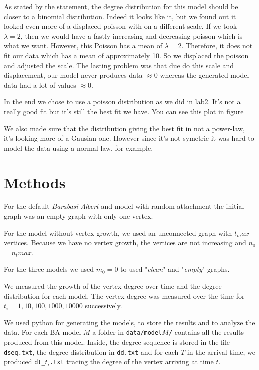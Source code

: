 \documentclass{article}
\begin{document}
As stated by the statement, the degree distribution for this model should be
closer to a binomial distribution. Indeed it looks like it, but we found out it
looked even more of a displaced poisson with on a different scale. If we took
$\lambda = 2$, then we would have a fastly increasing and decreasing poisson
which is what we want. However, this Poisson has a mean of $\lambda = 2$.
Therefore, it does not fit our data which has a mean of approximately 10.
So we displaced the poisson and adjusted the scale. The lasting problem was that
due do this scale and displacement, our model never produces data $\approx 0$
whereas the generated model data had a lot of values $\approx 0$.

In the end we chose to use a poisson distribution as we did in lab2. It's not a
really good fit but it's still the best fit we have. You can see this plot in
figure

We also made sure that the distribution giving the best fit in not a power-law,
it's looking more of a Gausian one. However since it's not symetric it was hard
to model the data using a normal law, for example.

\section{Methods} \label{methods}

For the default \textit{Barabasi-Albert} and model with random attachment the
initial graph was an empty graph with only one vertex.

For the model without vertex growth, we used an unconnected graph with $t_max$
vertices. Because we have no vertex growth, the vertices are not increasing and
$n_0$ = $n_tmax$.

For the three models we used $m_0 = 0$ to used "\textit{clean}" and
"\textit{empty}" graphs.

We measured the growth of the vertex degree over time and the degree
distribution for each model. The vertex degree was measured over the time for
$t_i = 1, 10, 100, 1000, 10000$ successively.

We used python for generating the models, to store the results and to analyze
the data. For each BA model $M$ a folder in \texttt{data/model$M$/} contains all
the results produced from this model. Inside, the degree sequence is stored in
the file \texttt{dseq.txt}, the degree distribution in \texttt{dd.txt} and for
each $T$ in the arrival time, we produced \texttt{dt\_$t_i$.txt} tracing the
degree of the vertex arriving at time $t$.
\end{document}
